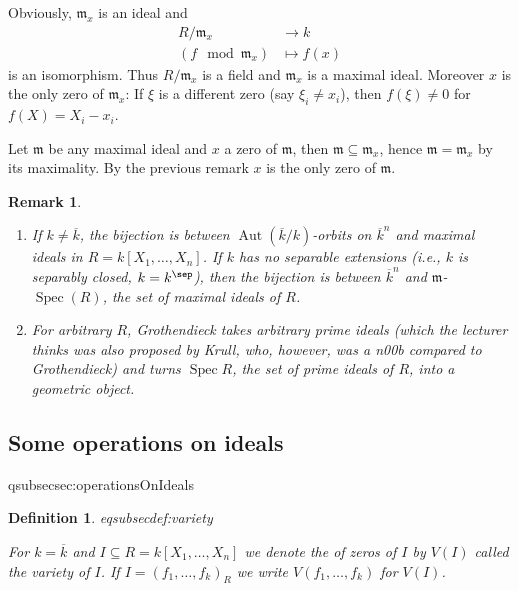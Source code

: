 \documentclass[DIV=14,parskip=full,pointednumbers]{scrartcl}
\newenvironment{alphanumerate}{\begin{enumerate}[label={$(\alph*)$},ref=\curthm]}{\end{enumerate}}
\theoremstyle{cthm}
\theoremstyle{cvarthm}
\renewenvironment{proof}[1][\proofname]
{\pushQED{\qed}\topsep0pt \partopsep0pt\trivlist\item[\hskip\labelsep\itshape #1.] }{\popQED\endtrivlist\addvspace{6pt plus 6pt}}
\theoremstyle{cdef}
\newtheorem{defi}{Definition}[subsection]
\newtheorem{rem}{Remark}[subsection]
\newcommand{\lbl}[1]{
	\label{#1}
	\ifmmode
	\expandafter\xdef\csname eqsubsec#1\endcsname{\thesubsection}
	\fi
}
\newcommand{\mm}{\mathfrak{m}}
\newcommand{\Aut}{\operatorname{Aut}}
\newcommand{\longto}{\longrightarrow}
\begin{document}
	\begin{proof}
		Obviously, $\mm_x$ is an ideal and
		\begin{align*}
		R/\mm_x &\longto k\\
		(f\mod \mm_x) &\longmapsto f(x)
		\end{align*}
		is an isomorphism. Thus $R/\mm_x$ is a field and $\mm_x$ is a maximal ideal. Moreover $x$ is the only zero of $\mm_x$: If $\xi$ is a different zero (say $\xi_i\neq x_i$), then $f(\xi)\neq 0$ for $f(X) = X_i-x_i$.
		
		Let $\mm$ be any maximal ideal and $x$ a zero of $\mm$, then $\mm\subseteq\mm_x$, hence $\mm=\mm_x$ by its maximality. By the previous remark $x$ is the only zero of $\mm$.
	\end{proof}
	\begin{rem}
		\begin{alphanumerate}
			\item If $k\neq\overline{k}$, the bijection is between $\Aut(\overline{k}/k)$-orbits on $\overline{k}^n$ and maximal ideals in $R=k[X_1,\ldots,X_n]$. If $k$ has no separable extensions (i.e., $k$ is \emph{separably closed}, $k=k^{\sep}$), then the bijection is between $\overline{k}^n$ and $\mm$-$\operatorname{Spec}(R)$, the set of maximal ideals of $R$.
			\item For arbitrary $R$, Grothendieck takes arbitrary prime ideals (which the lecturer thinks was also proposed by Krull, who, however, was a \emph{n00b} compared to Grothendieck) and turns $\operatorname{Spec} R$, the set of prime ideals of $R$, into a geometric object.
		\end{alphanumerate}
		
	\end{rem}
	
	
\subsection{Some operations on ideals}\lbl{sec:operationsOnIdeals}
	\begin{defi}\lbl{def:variety}
		For $k=\overline{k}$ and $I\subseteq R = k[X_1,\ldots,X_n]$ we denote the of zeros of $I$ by $V(I)$ called the \emph{variety} of $I$. If $I=(f_1,\ldots,f_k)_R$ we write $V(f_1,\ldots,f_k)$ for $V(I)$.
	\end{defi}
	
\end{document}
